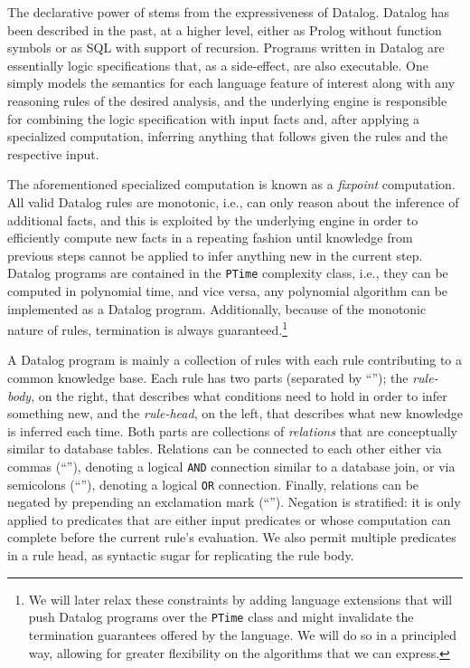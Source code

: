The declarative power of \doop{} stems from the expressiveness of Datalog. Datalog has been described in the past, at a higher level, either as Prolog without function symbols or as SQL with support of recursion. Programs written in Datalog are essentially logic specifications that, as a side-effect, are also executable. One simply models the semantics for each language feature of interest along with any reasoning rules of the desired analysis, and the underlying engine is responsible for combining the logic specification with input facts and, after applying a specialized computation, inferring anything that follows given the rules and the respective input.

The aforementioned specialized computation is known as a \emph{fixpoint} computation. All valid Datalog rules are monotonic, i.e., can only reason about the inference of additional facts, and this is exploited by the underlying engine in order to efficiently compute new facts in a repeating fashion until knowledge from previous steps cannot be applied to infer anything new in the current step. Datalog programs are contained in the \texttt{PTime} complexity class, i.e., they can be computed in polynomial time, and vice versa, any polynomial algorithm can be implemented as a Datalog program. Additionally, because of the monotonic nature of rules, termination is always guaranteed.\footnote{We will later relax these constraints by adding language extensions that will push Datalog programs over the \texttt{PTime} class and might invalidate the termination guarantees offered by the language. We will do so in a principled way, allowing for greater flexibility on the algorithms that we can express.}

A Datalog program is mainly a collection of rules with each rule contributing to a common knowledge base. Each rule has two parts (separated by ``\dlIf{}''); the \emph{rule-body}, on the right, that describes what conditions need to hold in order to infer something new, and the \emph{rule-head}, on the left, that describes what new knowledge is inferred each time. Both parts are collections of \emph{relations} that are conceptually similar to database tables. Relations can be connected to each other either via commas (``\code{,}''), denoting a logical \texttt{AND} connection similar to a database join, or via semicolons (``\code{;}''), denoting a logical \texttt{OR} connection. Finally, relations can be negated by prepending an exclamation mark (``\code{!}''). Negation is stratified: it is only applied to predicates that are either input predicates or whose computation can complete before the current rule's evaluation. We also permit multiple predicates in a rule head, as syntactic sugar for replicating the rule body.

